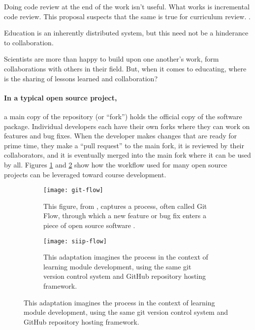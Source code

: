 \documentclass[11pt]{article}
\begin{document}
          Doing code review at the end of the work isn't useful. What works is 
          incremental code review. This proposal suspects that the same is true 
          for curriculum review. 
          \cite{wilson_software_2014}.

          Education is an inherently distributed system, but this need not be a 
          hinderance to collaboration.

          Scientists are more than happy to build upon one another's work, form 
          collaborations with others in their field. But, 
          when it comes to educating, where is the sharing of lessons learned 
          and collaboration? 


\paragraph{In a typical open source project,} a main copy of the 
          repository (or ``fork'') holds the 
          official copy of the software package. Individual developers each have their own 
          forks where they can work on features and 
          bug fixes. When the developer makes changes that are ready for prime 
          time, they make a ``pull request'' to the main fork, it is 
          reviewed by their collaborators, and it is eventually merged into the 
          main fork where it can be used by all. Figures 
          \ref{fig:sub1} and \ref{fig:sub2} show how the workflow used for many 
          open source projects can be leveraged toward course development.

          \begin{figure}
                  \centering
                  \begin{subfigure}{.4\textwidth}
                            \centering
                              \texttt{[image: git-flow]}
        \caption{This figure, from \cite{scopatz_effective_2016}, captures a process, often called Git Flow, through which a new feature or bug fix enters a piece of open source software \cite{scopatz_effective_2016}.}
                                  \label{fig:sub1}
                  \end{subfigure}\hfill%
                  \begin{subfigure}{.4\textwidth}
                            \centering
                              \texttt{[image: siip-flow]}
  \caption{This adaptation imagines the process in the context of learning module development, using the same git version control system and GitHub repository hosting framework.}
                                  \label{fig:sub2}
                  \end{subfigure}
                  \label{fig:test}
          \end{figure}
          \FloatBarrier
\end{document}
